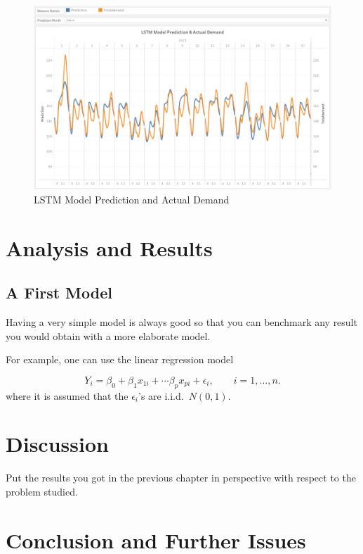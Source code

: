 \documentclass[mstat,12pt]{unswthesis}
\begin{document}
\begin{figure}[H]
\includegraphics{snapshots/Prediction 2.png}
\caption{LSTM Model Prediction and Actual Demand}\label{4.9}
\end{figure}

\hypertarget{analysis-and-results}{%
\chapter{Analysis and Results}\label{analysis-and-results}}

\hypertarget{a-first-model}{%
\section{A First Model}\label{a-first-model}}

Having a very simple model is always good so that you can benchmark any
result you would obtain with a more elaborate model.

\bigskip

For example, one can use the linear regression model

\[
Y_i = \beta_0 + \beta_1 x_{1i} + \cdots \beta_p x_{pi} + \epsilon_i, \qquad i=1,\ldots,n.
\] where it is assumed that the \(\epsilon_i\)'s are i.i.d.~\(N(0,1)\).

\hypertarget{discussion}{%
\chapter{Discussion}\label{discussion}}

Put the results you got in the previous chapter in perspective with
respect to the problem studied.

\hypertarget{conclusion-and-further-issues}{%
\chapter{Conclusion and Further
Issues}\label{conclusion-and-further-issues}}
\end{document}
